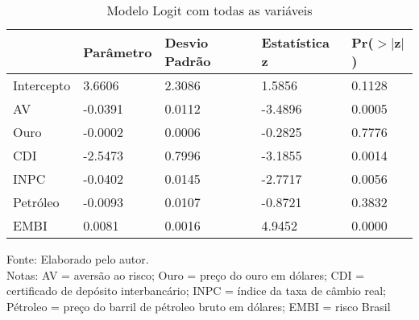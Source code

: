 \begin{table}[H]
\caption{Modelo Logit com todas as variáveis}
\begin{tabular}{P{2.8cm}P{2.8cm}P{2.8cm}P{2.8cm}P{2.8cm}}
  \hline
             & Parâmetro & Desvio Padrão & Estatística z  & Pr($>$$|$z$|$) \\ 
  \hline
  Intercepto &    3.6606 & 2.3086        & 1.5856         & 0.1128 \\ 
  AV         & -0.0391   & 0.0112        & -3.4896        & 0.0005 \\ 
  Ouro       & -0.0002   & 0.0006        & -0.2825        & 0.7776 \\ 
  CDI        & -2.5473   & 0.7996        & -3.1855        & 0.0014 \\ 
  INPC       & -0.0402   & 0.0145        & -2.7717        & 0.0056 \\ 
  Petróleo   & -0.0093   & 0.0107        & -0.8721        & 0.3832 \\ 
  EMBI       & 0.0081    & 0.0016        & 4.9452         & 0.0000 \\ 
   \hline
\end{tabular}
\label{t3}
{\footnotesize Fonte: Elaborado pelo autor. \\
Notas: AV = aversão ao risco; Ouro = preço do ouro em dólares; CDI = certificado de depósito interbancário; INPC = índice da taxa de câmbio real; Pétroleo = preço do barril de pétroleo bruto em dólares;   EMBI = risco Brasil
}
\end{table}
